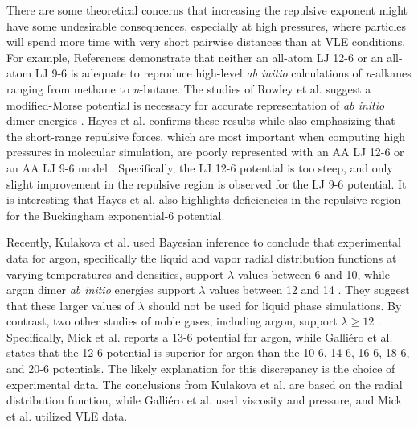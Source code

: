 \documentclass[preprint,letterpaper,floatfix,citeautoscript,aip,jcp]{revtex4-1}
\begin{document}
There are some theoretical concerns that increasing the repulsive exponent might have some undesirable consequences, especially at high pressures, where 
particles will spend more time with very short  pairwise distances
than at VLE conditions. For example, References  demonstrate that neither an all-atom LJ 12-6 or an all-atom LJ 9-6 is adequate to reproduce high-level \textit{ab initio} calculations of \textit{n}-alkanes ranging from methane to \textit{n}-butane. 
The studies of Rowley et al. suggest a modified-Morse potential is necessary for accurate representation of \textit{ab initio} dimer energies \cite{Rowley1999,Rowley2001}. Hayes et al. confirms these results while also emphasizing that the short-range repulsive forces, which are most important when computing high pressures in molecular simulation, are poorly represented with an AA LJ 12-6 or an AA LJ 9-6 model \cite{Hayes2004}. Specifically, the LJ 12-6 potential is too steep, and only slight improvement in the repulsive region is observed for the LJ 9-6 potential. %
It is interesting that Hayes et al. also highlights deficiencies in the repulsive region for the Buckingham exponential-6 potential. 

Recently, Kulakova et al. used Bayesian inference to conclude that experimental data for argon, specifically the liquid and vapor radial distribution functions at varying temperatures and densities, support $\lambda$ values between 6 and 10, while argon dimer \textit{ab initio} energies support $\lambda$ values between 12 and 14 \cite{Kulakova2017}. They suggest that these larger values of $\lambda$ should not be used for liquid phase simulations. By contrast, two other studies of noble gases, including argon, support $\lambda \ge 12$ \cite{Galliero2005,Mick_Mie}. Specifically, Mick et al. reports a 13-6 potential for argon, while Galli{\'e}ro et al. states that the 12-6 potential is superior for argon than the 10-6, 14-6, 16-6, 18-6, and 20-6 potentials. The likely explanation for this discrepancy is the choice of experimental data. The conclusions from Kulakova et al. are based on the radial distribution function, while Galli{\'e}ro et al. used viscosity and pressure, and Mick et al. utilized VLE data.
\end{document}
